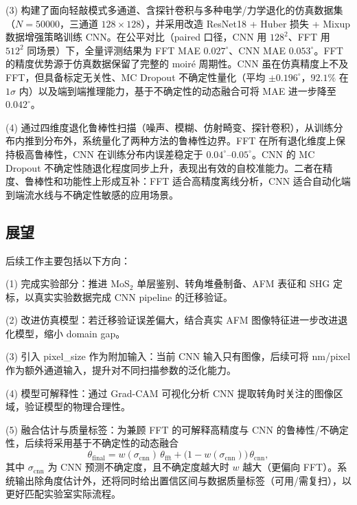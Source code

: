 \documentclass[supercite]{HustGraduPaper}
\begin{document}
(3) 构建了面向轻敲模式多通道、含探针卷积与多种电学/力学退化的仿真数据集（$N=50000$，三通道 $128{\times}128$），并采用改造 ResNet18 + Huber 损失 + Mixup 数据增强策略训练 CNN。在公平对比（paired 口径，CNN 用 $128^2$、FFT 用 $512^2$ 同场景）下，全量评测结果为 FFT MAE $0.027^{\circ}$、CNN MAE $0.053^{\circ}$。FFT 的精度优势源于仿真数据保留了完整的 moiré 周期性。CNN 虽在仿真精度上不及 FFT，但具备标定无关性、MC Dropout 不确定性量化（平均 $\pm 0.196^{\circ}$，$92.1\%$ 在 $1\sigma$ 内）以及端到端推理能力，基于不确定性的动态融合可将 MAE 进一步降至 $0.042^{\circ}$。

(4) 通过四维度退化鲁棒性扫描（噪声、模糊、仿射畸变、探针卷积），从训练分布内推到分布外，系统量化了两种方法的鲁棒性边界。FFT 在所有退化维度上保持极高鲁棒性，CNN 在训练分布内误差稳定于 $0.04^{\circ}$--$0.05^{\circ}$。CNN 的 MC Dropout 不确定性随退化程度同步上升，表现出有效的自校准能力。二者在精度、鲁棒性和功能性上形成互补：FFT 适合高精度离线分析，CNN 适合自动化端到端流水线与不确定性敏感的应用场景。

\subsection{展望}

后续工作主要包括以下方向：

(1) 完成实验部分：推进 MoS$_2$ 单层鉴别、转角堆叠制备、AFM 表征和 SHG 定标，以真实实验数据完成 CNN pipeline 的迁移验证。

(2) 改进仿真模型：若迁移验证误差偏大，结合真实 AFM 图像特征进一步改进退化模型，缩小 domain gap。

(3) 引入 pixel\_size 作为附加输入：当前 CNN 输入只有图像，后续可将 nm/pixel 作为额外通道输入，提升对不同扫描参数的泛化能力。

(4) 模型可解释性：通过 Grad-CAM 可视化分析 CNN 提取转角时关注的图像区域，验证模型的物理合理性。

(5) 融合估计与质量标签：为兼顾 FFT 的可解释高精度与 CNN 的鲁棒性/不确定性，后续将采用基于不确定性的动态融合
\begin{equation}
  \theta_{\mathrm{final}} = w(\sigma_{\mathrm{cnn}})\,\theta_{\mathrm{fft}}
  + \bigl(1-w(\sigma_{\mathrm{cnn}})\bigr)\,\theta_{\mathrm{cnn}},
\end{equation}
其中 $\sigma_{\mathrm{cnn}}$ 为 CNN 预测不确定度，且不确定度越大时 $w$ 越大（更偏向 FFT）。系统输出除角度估计外，还将同时给出置信区间与数据质量标签（可用/需复扫），以更好匹配实验室实际流程。


\end{document}
